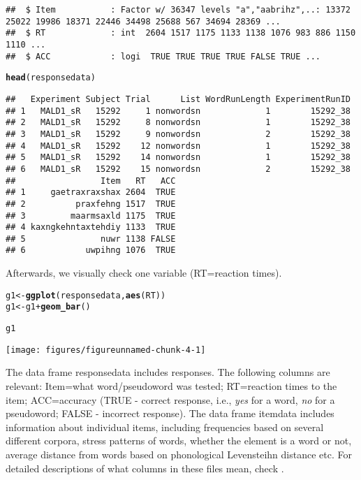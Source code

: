 \documentclass{article}\usepackage[]{graphicx}\usepackage[]{color}
\makeatletter
\def\maxwidth{ %
  \ifdim\Gin@nat@width>\linewidth
    \linewidth
  \else
    \Gin@nat@width
  \fi
}
\newcommand{\hlopt}[1]{\textcolor[rgb]{0,0,0}{#1}}%
\newcommand{\hlstd}[1]{\textcolor[rgb]{0.345,0.345,0.345}{#1}}%
\newcommand{\hlkwb}[1]{\textcolor[rgb]{0.69,0.353,0.396}{#1}}%
\newcommand{\hlkwd}[1]{\textcolor[rgb]{0.737,0.353,0.396}{\textbf{#1}}}%
\newenvironment{kframe}{%
 \def\at@end@of@kframe{}%
 \ifinner\ifhmode%
  \def\at@end@of@kframe{\end{minipage}}%
  \begin{minipage}{\columnwidth}%
 \fi\fi%
 \def\FrameCommand##1{\hskip\@totalleftmargin \hskip-\fboxsep
 \colorbox{shadecolor}{##1}\hskip-\fboxsep
     \hskip-\linewidth \hskip-\@totalleftmargin \hskip\columnwidth}%
 \MakeFramed {\advance\hsize-\width
   \@totalleftmargin\z@ \linewidth\hsize
   \@setminipage}}%
 {\par\unskip\endMakeFramed%
 \at@end@of@kframe}
\newenvironment{knitrout}{}{} %
\makeatother
\begin{document}
\begin{knitrout}
\begin{kframe}
\begin{verbatim}
##  $ Item           : Factor w/ 36347 levels "a","aabrihz",..: 13372 25022 19986 18371 22446 34498 25688 567 34694 28369 ...
##  $ RT             : int  2604 1517 1175 1133 1138 1076 983 886 1150 1110 ...
##  $ ACC            : logi  TRUE TRUE TRUE TRUE FALSE TRUE ...
\end{verbatim}
\begin{alltt}
\hlkwd{head}\hlstd{(responsedata)}
\end{alltt}
\begin{verbatim}
##   Experiment Subject Trial      List WordRunLength ExperimentRunID
## 1   MALD1_sR   15292     1 nonwordsn             1        15292_38
## 2   MALD1_sR   15292     8 nonwordsn             1        15292_38
## 3   MALD1_sR   15292     9 nonwordsn             2        15292_38
## 4   MALD1_sR   15292    12 nonwordsn             1        15292_38
## 5   MALD1_sR   15292    14 nonwordsn             1        15292_38
## 6   MALD1_sR   15292    15 nonwordsn             2        15292_38
##                 Item   RT   ACC
## 1     gaetraxraxshax 2604  TRUE
## 2          praxfehng 1517  TRUE
## 3         maarmsaxld 1175  TRUE
## 4 kaxngkehntaxtehdiy 1133  TRUE
## 5               nuwr 1138 FALSE
## 6            uwpihng 1076  TRUE
\end{verbatim}
\end{kframe}
\end{knitrout}

Afterwards, we visually check one variable (RT=reaction times).

\begin{knitrout}
\color{fgcolor}\begin{kframe}
\begin{alltt}
\hlstd{g1} \hlkwb{<-} \hlkwd{ggplot}\hlstd{(responsedata,} \hlkwd{aes}\hlstd{(RT))}
\hlstd{g1} \hlkwb{<-} \hlstd{g1} \hlopt{+} \hlkwd{geom_bar}\hlstd{()}

\hlstd{g1}
\end{alltt}
\end{kframe}
\texttt{[image: figures/figureunnamed-chunk-4-1]} 

\end{knitrout}


The data frame responsedata includes responses. The following columns are relevant: Item=what word/pseudoword was tested; RT=reaction times to the item; ACC=accuracy (TRUE - correct response, i.e., \textit{yes} for a word, \textit{no} for a pseudoword; FALSE - incorrect response). The data frame itemdata includes information about individual items, including frequencies based on several different corpora, stress patterns of words, whether the element is a word or not, average distance from words based on phonological Levensteihn distance etc. For detailed descriptions of what columns in these files mean, check \cite{tucker+19}.
\end{document}
